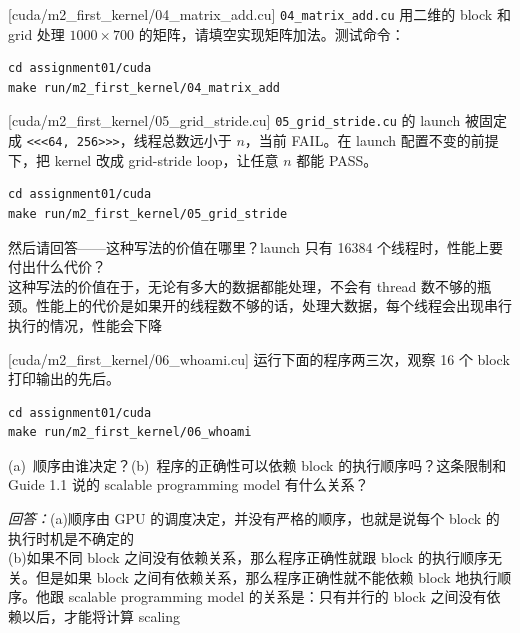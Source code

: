 \documentclass[11pt,a4paper,fontset=none]{ctexart}
\begin{document}
[cuda/m2\_first\_kernel/04\_matrix\_add.cu]
\texttt{04\_matrix\_add.cu} 用二维的 block 和 grid 处理 $1000 \times 700$ 的矩阵，请填空实现矩阵加法。测试命令：

\begin{lstlisting}
cd assignment01/cuda
make run/m2_first_kernel/04_matrix_add
\end{lstlisting}

[cuda/m2\_first\_kernel/05\_grid\_stride.cu]
\texttt{05\_grid\_stride.cu} 的 launch 被固定成 \texttt{<<<64, 256>>>}，线程总数远小于 $n$，当前 FAIL。在 launch 配置不变的前提下，把 kernel 改成 grid-stride loop，让任意 $n$ 都能 PASS。

\begin{lstlisting}
cd assignment01/cuda
make run/m2_first_kernel/05_grid_stride
\end{lstlisting}

然后请回答——这种写法的价值在哪里？launch 只有 16384 个线程时，性能上要付出什么代价？\\
这种写法的价值在于，无论有多大的数据都能处理，不会有 thread 数不够的瓶颈。性能上的代价是如果开的线程数不够的话，处理大数据，每个线程会出现串行执行的情况，性能会下降

[cuda/m2\_first\_kernel/06\_whoami.cu]
运行下面的程序两三次，观察 16 个 block 打印输出的先后。

\begin{lstlisting}
cd assignment01/cuda
make run/m2_first_kernel/06_whoami
\end{lstlisting}

(a)~顺序由谁决定？(b)~程序的正确性可以依赖 block 的执行顺序吗？这条限制和 Guide 1.1 说的 scalable programming model 有什么关系？\\
\par\noindent\textit{回答：}(a)顺序由 GPU 的调度决定，并没有严格的顺序，也就是说每个 block 的执行时机是不确定的\\
(b)如果不同 block 之间没有依赖关系，那么程序正确性就跟 block 的执行顺序无关。但是如果 block 之间有依赖关系，那么程序正确性就不能依赖 block 地执行顺序。他跟 scalable programming model 的关系是：只有并行的 block 之间没有依赖以后，才能将计算 scaling
\end{document}
